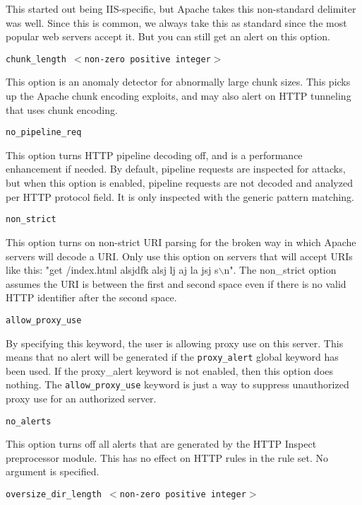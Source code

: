 \documentclass[english]{report}
\newcounter{slistnum}
\newenvironment{slist}
{ \begin{list}{ {\bf \arabic{slistnum}.} }{\usecounter{slistnum} } }
{ \end{list} }
\begin{document}
\begin{slist}
This started out being IIS-specific, but Apache takes this non-standard
delimiter was well.  Since this is common, we always take this as standard
since the most popular web servers accept it.  But you can still get an alert
on this option.

\item \texttt{chunk\_length $<$non-zero positive integer$>$}

This option is an anomaly detector for abnormally large chunk sizes.  This
picks up the Apache chunk encoding exploits, and may also alert on HTTP
tunneling that uses chunk encoding.

\item \texttt{no\_pipeline\_req}

This option turns HTTP pipeline decoding off, and is a performance enhancement
if needed.  By default, pipeline requests are inspected for attacks, but when
this option is enabled, pipeline requests are not decoded and analyzed per HTTP
protocol field.  It is only inspected with the generic pattern matching.

\item \texttt{non\_strict}

This option turns on non-strict URI parsing for the broken way in which Apache
servers will decode a URI.  Only use this option on servers that will accept
URIs like this: "get /index.html alsjdfk alsj lj aj  la jsj s$\backslash$n".
The non\_strict option assumes the URI is between the first and second space
even if there is no valid HTTP identifier after the second space.

\item \texttt{allow\_proxy\_use}

By specifying this keyword, the user is allowing proxy use on this server.
This means that no alert will be generated if the \texttt{proxy\_alert} global
keyword has been used.  If the proxy\_alert keyword is not enabled, then this
option does nothing.  The \texttt{allow\_proxy\_use} keyword is just a way to
suppress unauthorized proxy use for an authorized server.  

\item \texttt{no\_alerts}

This option turns off all alerts that are generated by the HTTP Inspect
preprocessor module.  This has no effect on HTTP rules in the rule set.  No
argument is specified.

\item \texttt{oversize\_dir\_length $<$non-zero positive integer$>$}


\end{slist}
\end{document}
